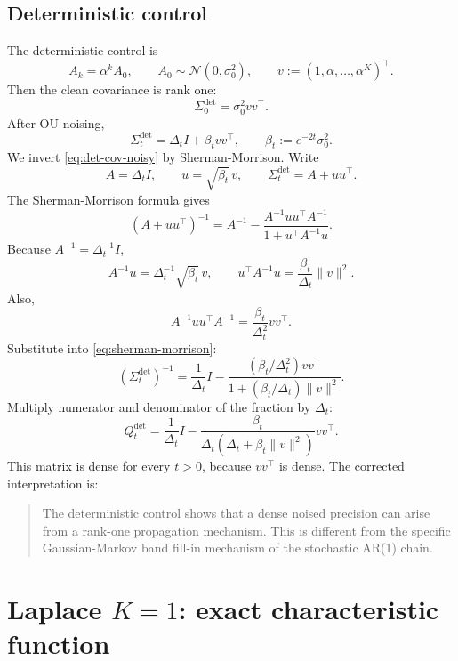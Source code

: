 \documentclass[11pt,a4paper]{article}
\newcommand{\Dt}{\Delta_t}
\begin{document}
\subsection{Deterministic control}
\label{sec:det-control}

The deterministic control is
\begin{equation}
A_k = \alpha^k A_0,
\qquad
A_0 \sim \mathcal N(0,\sigma_0^2),
\qquad
v := (1,\alpha,\dots,\alpha^K)^\top.
\label{eq:det-control}
\end{equation}
Then the clean covariance is rank one:
\begin{equation}
\Sigma_0^{\mathrm{det}} = \sigma_0^2 v v^\top.
\label{eq:det-cov-clean}
\end{equation}
After OU noising,
\begin{equation}
\Sigma_t^{\mathrm{det}} = \Dt I + \beta_t v v^\top,
\qquad
\beta_t := e^{-2t} \sigma_0^2.
\label{eq:det-cov-noisy}
\end{equation}
We invert \eqref{eq:det-cov-noisy} by Sherman-Morrison. Write
\[
A = \Dt I,
\qquad
u = \sqrt{\beta_t}\,v,
\qquad
\Sigma_t^{\mathrm{det}} = A + u u^\top.
\]
The Sherman-Morrison formula gives
\begin{equation}
(A+u u^\top)^{-1}
=
A^{-1} - \frac{A^{-1} u u^\top A^{-1}}{1+u^\top A^{-1} u}.
\label{eq:sherman-morrison}
\end{equation}
Because $A^{-1}=\Dt^{-1} I$,
\[
A^{-1}u = \Dt^{-1} \sqrt{\beta_t}\, v,
\qquad
u^\top A^{-1}u = \frac{\beta_t}{\Dt} \|v\|^2.
\]
Also,
\[
A^{-1}u u^\top A^{-1}
=
\frac{\beta_t}{\Dt^2} v v^\top.
\]
Substitute into \eqref{eq:sherman-morrison}:
\[
(\Sigma_t^{\mathrm{det}})^{-1}
=
\frac{1}{\Dt} I - \frac{(\beta_t/\Dt^2) v v^\top}{1+(\beta_t/\Dt)\|v\|^2}.
\]
Multiply numerator and denominator of the fraction by $\Dt$:
\begin{equation}
Q_t^{\mathrm{det}}
=
\frac{1}{\Dt} I - \frac{\beta_t}{\Dt(\Dt+\beta_t\|v\|^2)} v v^\top.
\label{eq:det-precision}
\end{equation}
This matrix is dense for every $t>0$, because $v v^\top$ is dense. The corrected interpretation is:
\begin{quote}
The deterministic control shows that a dense noised precision can arise from a rank-one propagation mechanism. This is different from the specific Gaussian-Markov band fill-in mechanism of the stochastic AR(1) chain.
\end{quote}

\section[Laplace K=1: exact characteristic function]{Laplace $K=1$: exact characteristic function}
\label{sec:cf-laplace}
\end{document}
